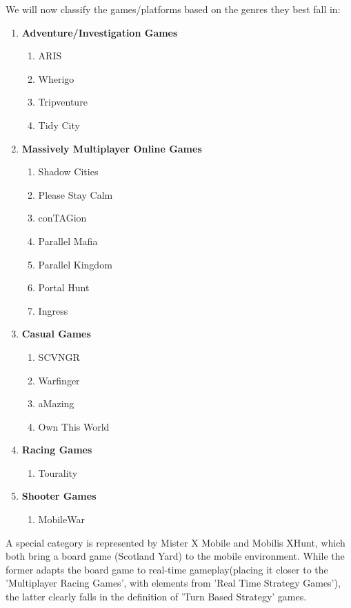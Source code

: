 \documentclass{article}
\begin{document}
We will now classify the games/platforms based on the genres they best fall in:

\begin{enumerate}
  \item \textbf{Adventure/Investigation Games}
  		\begin{enumerate}
  	  		\item ARIS
  	  		\item Wherigo
  	  		\item Tripventure
  	  		\item Tidy City	  
  		\end{enumerate}
  		
  \item \textbf{Massively Multiplayer Online Games}
  		\begin{enumerate}
  	  		\item Shadow Cities
  	  		\item Please Stay Calm
  	  		\item conTAGion
  	  		\item Parallel Mafia
  	  		\item Parallel Kingdom
  	  		\item Portal Hunt
  	  		\item Ingress
  		\end{enumerate}
  		
  \item \textbf{Casual Games}
  		\begin{enumerate}
  	  		\item SCVNGR
  	  		\item Warfinger  	  		
  	  		\item aMazing 	
  	  		\item Own This World	  	  		
  		\end{enumerate}
  		
  \item \textbf{Racing Games}
  		\begin{enumerate}
  	  		\item Tourality  	  		 	  		  	  		
  		\end{enumerate}
  		
  \item \textbf{Shooter Games}
  		\begin{enumerate}
  	  		\item MobileWar	  		  	  		
  		\end{enumerate}  
\end{enumerate}

A special category is represented by Mister X Mobile and Mobilis XHunt, which
both bring a board game (Scotland Yard) to the mobile environment. While the
former adapts the board game to real-time gameplay(placing it closer to the
'Multiplayer Racing Games', with elements from 'Real Time Strategy Games'), the
latter clearly falls in the definition of 'Turn Based Strategy' games.
\end{document}
